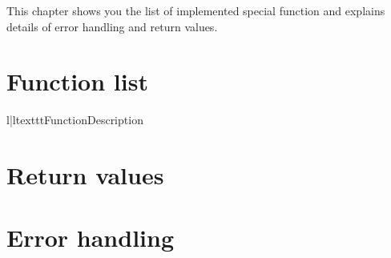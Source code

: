 
This chapter shows you the list of implemented special function and explains
details of error handling and return values.

\section{Function list}

\begin{longtableii}{l|l}{texttt}{Function}{Description}
\end{longtableii}

\section{Return values}

\section{Error handling}
